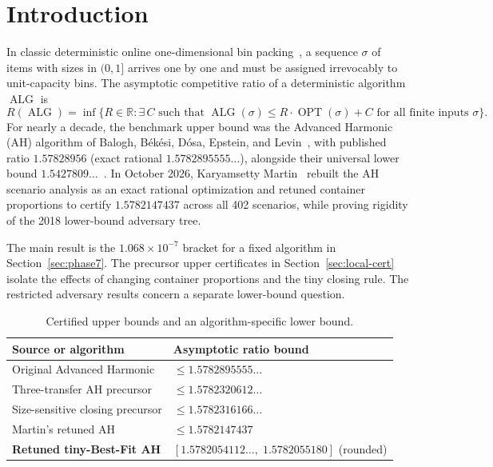 \documentclass[11pt,letterpaper]{article}
\theoremstyle{definition}
\theoremstyle{remark}
\newcommand{\OPT}{\operatorname{OPT}}
\newcommand{\ALG}{\operatorname{ALG}}
\newcommand{\R}{\mathbb{R}}
\begin{document}
\section{Introduction}
In classic deterministic online one-dimensional bin packing~\cite{LeeLee1985,Seiden2002}, a sequence $\sigma$ of items with sizes in $(0,1]$ arrives one by one and must be assigned irrevocably to unit-capacity bins. The asymptotic competitive ratio of a deterministic algorithm $\ALG$ is
\[
  R(\ALG) = \inf\bigl\{ R \in \R : \exists\, C \text{ such that } \ALG(\sigma) \le R \cdot \OPT(\sigma) + C \text{ for all finite inputs } \sigma \bigr\}.
\]
For nearly a decade, the benchmark upper bound was the Advanced Harmonic (AH) algorithm of Balogh, B\'ek\'esi, D\'osa, Epstein, and Levin~\cite{Balogh2018AH}, with published ratio $1.57828956$ (exact rational $1.5782895555\dots$), alongside their universal lower bound $1.5427809\dots$~\cite{Balogh2019LB}. In October 2026, Karyamsetty Martin~\cite{Martin2026} rebuilt the AH scenario analysis as an exact rational optimization and retuned container proportions to certify $1.5782147437$ across all 402 scenarios, while proving rigidity of the 2018 lower-bound adversary tree.

The main result is the $1.068\times 10^{-7}$ bracket for a fixed algorithm in Section~\ref{sec:phase7}. The precursor upper certificates in Section~\ref{sec:local-cert} isolate the effects of changing container proportions and the tiny closing rule. The restricted adversary results concern a separate lower-bound question.

\begin{table}[!htbp]
\centering\small
\caption{Certified upper bounds and an algorithm-specific lower bound.}
\label{tab:packing-layers}
\begin{tabularx}{\linewidth}{@{}X l@{}}
\toprule
Source or algorithm & Asymptotic ratio bound \\
\midrule
Original Advanced Harmonic~\cite{Balogh2018AH} & $\le 1.5782895555\dots$ \\
Three-transfer AH precursor & $\le 1.5782320612\dots$ \\
Size-sensitive closing precursor & $\le 1.5782316166\dots$ \\
Martin's retuned AH~\cite{Martin2026} & $\le 1.5782147437$ \\
\textbf{Retuned tiny-Best-Fit AH} & $[1.5782054112\dots,\;1.5782055180]$ (rounded) \\
\bottomrule
\end{tabularx}
\end{table}
\end{document}
